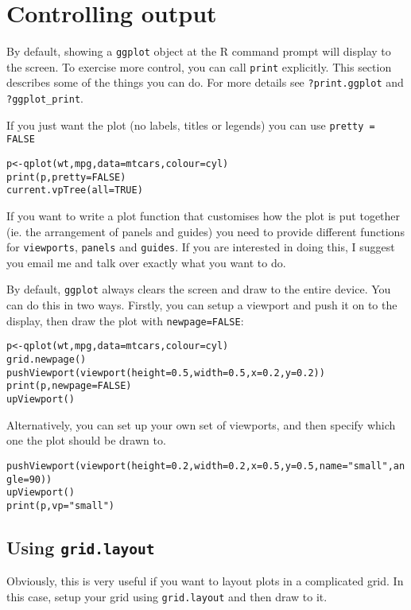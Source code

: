 \section{Controlling output}\label{sec:controlling_output}

By default, showing a {\tt ggplot} object at the R command prompt will display to the screen.  To exercise more control, you can call {\tt print} explicitly.  This section describes some of the things you can do.  For more details see {\tt ?print.ggplot} and {\tt ?ggplot\_print}.

If you just want the plot (no labels, titles or legends) you can use {\tt pretty = FALSE}

\begin{alltt}
p <- qplot(wt, mpg, data=mtcars, colour=cyl)
print(p, pretty = FALSE)
current.vpTree(all=TRUE)
\end{alltt}

If you want to write a plot function that customises how the plot is put together (ie. the arrangement of panels and guides) you need to provide different functions for {\tt viewports}, {\tt panels} and {\tt guides}.  If you are interested in doing this, I suggest you email me and talk over exactly what you want to do.

By default, {\tt ggplot} always clears the screen and draw to the entire device.  You can do this in two ways.  Firstly, you can setup a viewport and push it on to the display, then draw the plot with {\tt newpage=FALSE}:

\begin{alltt}
p <- qplot(wt, mpg, data=mtcars, colour=cyl)
grid.newpage()
pushViewport(viewport(height=0.5, width=0.5, x=0.2, y=0.2))
print(p, newpage=FALSE)
upViewport()
\end{alltt}

Alternatively, you can set up your own set of viewports, and then specify which one the plot should be drawn to.

\begin{alltt}
pushViewport(viewport(height=0.2, width=0.2, x=0.5, y=0.5, name="small", angle=90))
upViewport()
print(p, vp="small")
\end{alltt}

\subsection{Using {\tt grid.layout}}\label{sub:using_grid_layout}

Obviously, this is very useful if you want to layout plots in a complicated grid.  In this case, setup your grid using {\tt grid.layout} and then draw to it.

